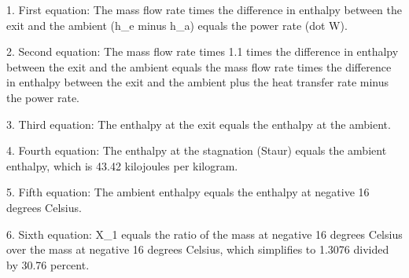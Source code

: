 1. First equation: The mass flow rate times the difference in enthalpy between the exit and the ambient (h_e minus h_a) equals the power rate (dot W).

2. Second equation: The mass flow rate times 1.1 times the difference in enthalpy between the exit and the ambient equals the mass flow rate times the difference in enthalpy between the exit and the ambient plus the heat transfer rate minus the power rate.

3. Third equation: The enthalpy at the exit equals the enthalpy at the ambient.

4. Fourth equation: The enthalpy at the stagnation (Staur) equals the ambient enthalpy, which is 43.42 kilojoules per kilogram.

5. Fifth equation: The ambient enthalpy equals the enthalpy at negative 16 degrees Celsius.

6. Sixth equation: X_1 equals the ratio of the mass at negative 16 degrees Celsius over the mass at negative 16 degrees Celsius, which simplifies to 1.3076 divided by 30.76 percent.